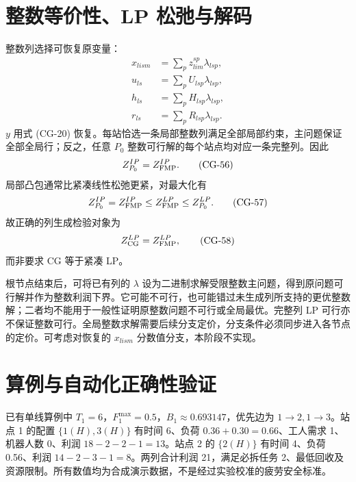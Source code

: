\documentclass[UTF8,a4paper,11pt]{ctexart}
\newcommand{\cg}[1]{\tag{CG-#1}}
\begin{document}
\section{整数等价性、LP 松弛与解码}
整数列选择可恢复原变量：
\begin{align}
x_{lism}&=\sum_pz_{lim}^{sp}\lambda_{lsp},\cg{52}\\
u_{ls}&=\sum_pU_{lsp}\lambda_{lsp},\cg{53}\\
h_{ls}&=\sum_pH_{lsp}\lambda_{lsp},\cg{54}\\
r_{ls}&=\sum_pR_{lsp}\lambda_{lsp}.\cg{55}
\end{align}
$y$ 用式 (CG-20) 恢复。每站恰选一条局部整数列满足全部局部约束，主问题保证全部全局行；反之，任意 $P_0$ 整数可行解的每个站点均对应一条完整列。因此
\begin{equation}Z_{P_0}^{IP}=Z_{\rm FMP}^{IP}.\cg{56}\end{equation}
局部凸包通常比紧凑线性松弛更紧，对最大化有
\begin{equation}Z_{P_0}^{IP}=Z_{\rm FMP}^{IP}\leq Z_{\rm FMP}^{LP}\leq Z_{P_0}^{LP}.\cg{57}\end{equation}
故正确的列生成检验对象为
\begin{equation}Z_{\rm CG}^{LP}=Z_{\rm FMP}^{LP},\cg{58}\end{equation}
而非要求 CG 等于紧凑 LP。

根节点结束后，可将已有列的 $\lambda$ 设为二进制求解受限整数主问题，得到原问题可行解并作为整数利润下界。它可能不可行，也可能错过未生成列所支持的更优整数解；二者均不能用于一般性证明原整数问题不可行或全局最优。完整列 LP 可行亦不保证整数可行。全局整数求解需要后续分支定价，分支条件必须同步进入各节点的定价。可考虑对恢复的 $x_{lism}$ 分数值分支，本阶段不实现。

\section{算例与自动化正确性验证}
已有单线算例中 $T_1=6$，$F_1^{\max}=0.5$，$B_1\approx0.693147$，优先边为 $1\to2,1\to3$。站点 1 的配置 $\{1(H),3(H)\}$ 有时间 6、负荷 $0.36+0.30=0.66$、工人需求 1、机器人数 0、利润 $18-2-2-1=13$。站点 2 的 $\{2(H)\}$ 有时间 4、负荷 0.56、利润 $14-2-3-1=8$。两列合计利润 21，满足必拆任务 2、最低回收及资源限制。所有数值均为合成演示数据，不是经过实验校准的疲劳安全标准。
\end{document}
